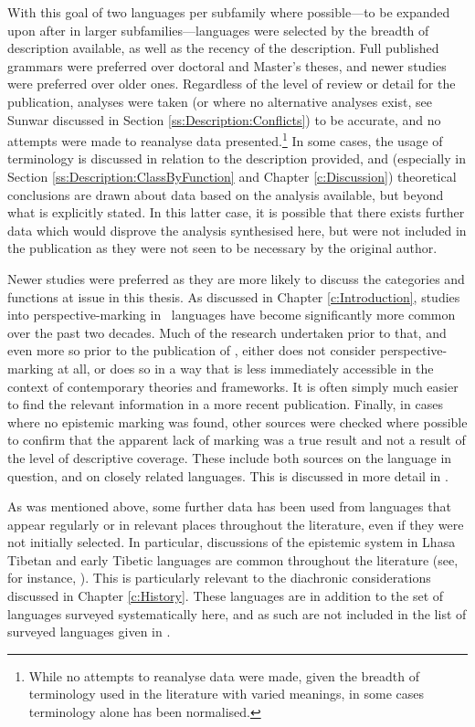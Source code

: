With this goal of two languages per subfamily where possible---to be expanded upon after in larger subfamilies---languages were selected by the breadth of description available, as well as the recency of the description. Full published grammars were preferred over doctoral and Master's theses, and newer studies were preferred over older ones. Regardless of the level of review or detail for the publication, analyses were taken (or where no alternative analyses exist, see Sunwar discussed in Section \ref{ss:Description:Conflicts}) to be accurate, and no attempts were made to reanalyse data presented.\footnote{While no attempts to reanalyse data were made, given the breadth of terminology used in the literature with varied meanings, in some cases terminology alone has been normalised.} In some cases, the usage of terminology is discussed in relation to the description provided, and (especially in Section \ref{ss:Description:ClassByFunction} and Chapter \ref{c:Discussion}) theoretical conclusions are drawn about data based on the analysis available, but beyond what is explicitly stated. In this latter case, it is possible that there exists further data which would disprove the analysis synthesised here, but were not included in the publication as they were not seen to be necessary by the original author.

Newer studies were preferred as they are more likely to discuss the categories and functions at issue in this thesis. As discussed in Chapter \ref{c:Introduction}, studies into perspective-marking in \lfam\ languages have become significantly more common over the past two decades. Much of the research undertaken prior to that, and even more so prior to the publication of , either does not consider perspective-marking at all, or does so in a way that is less immediately accessible in the context of contemporary theories and frameworks. It is often simply much easier to find the relevant information in a more recent publication. Finally, in cases where no epistemic marking was found, other sources were checked where possible to confirm that the apparent lack of marking was a true result and not a result of the level of descriptive coverage. These include both sources on the language in question, and on closely related languages. This is discussed in more detail in .

As was mentioned above, some further data has been used from languages that appear regularly or in relevant places throughout the literature, even if they were not initially selected. In particular, discussions of the epistemic system in Lhasa Tibetan and early Tibetic languages are common throughout the literature (see, for instance, ). This is particularly relevant to the diachronic considerations discussed in Chapter \ref{c:History}. These languages are in addition to the set of languages surveyed systematically here, and as such are not included in the list of surveyed languages given in .

